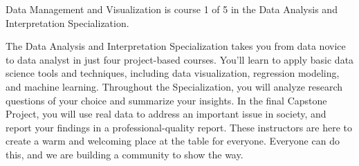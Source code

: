 Data Management and Visualization is course 1 of 5 in the Data Analysis and Interpretation Specialization.

The Data Analysis and Interpretation Specialization takes you from data novice to data analyst in just four project-based courses. You’ll learn to apply basic data science tools and techniques, including data visualization, regression modeling, and machine learning. Throughout the Specialization, you will analyze research questions of your choice and summarize your insights. In the final Capstone Project, you will use real data to address an important issue in society, and report your findings in a professional-quality report. These instructors are here to create a warm and welcoming place at the table for everyone. Everyone can do this, and we are building a community to show the way.
